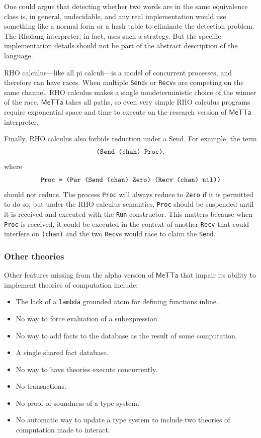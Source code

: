 \documentclass{article}
\begin{document}
One could argue that detecting whether two words are in the same
equivalence class is, in general, undecidable, and any real
implementation would use something like a normal form or a hash table
to eliminate the detection problem.  The Rholang interpreter, in fact,
uses such a strategy.  But the specific implementation details should
not be part of the abstract description of the language.

RHO calculus---like all pi calculi---is a model of concurrent
processes, and therefore can have races.  When multiple \verb+Send+s
or \verb+Recv+s are competing on the same channel, RHO calculus makes
a single nondeterministic choice of the winner of the race.
$\mathsf{MeTTa}$ takes all paths, so even very simple RHO calculus
programs require exponential space and time to execute on the research
version of $\mathsf{MeTTa}$ interpreter.

Finally, RHO calculus also forbids reduction under a Send.  For example, the term 
\[\mbox{\tt(Send (chan) Proc)},\]
where
\[\mbox{\tt Proc = (Par (Send (chan) Zero) (Recv (chan) nil))}\]
should not reduce.  The process \verb+Proc+ will always reduce to \verb+Zero+ if it is permitted to do so; but under the RHO calculus semantics, \verb+Proc+ should be suspended until it is received and executed with the \verb+Run+ constructor.  This matters because when \verb+Proc+ is received, it could be executed in the context of another \verb+Recv+ that could interfere on \verb+(chan)+ and the two \verb+Recv+s would race to claim the \verb+Send+.

\subsubsection{Other theories}

Other features missing from the alpha version of $\mathsf{MeTTa}$ that impair its ability to implement theories of computation include:
\begin{itemize}
    \item The lack of a \verb+lambda+ grounded atom for defining functions inline.
    \item No way to force evaluation of a subexpression.
    \item No way to add facts to the database as the result of some computation.
    \item A single shared fact database.
    \item No way to have theories execute concurrently.
    \item No transactions.
    \item No proof of soundness of a type system.
    \item No automatic way to update a type system to include two theories of computation made to interact.
\end{itemize}
\end{document}
